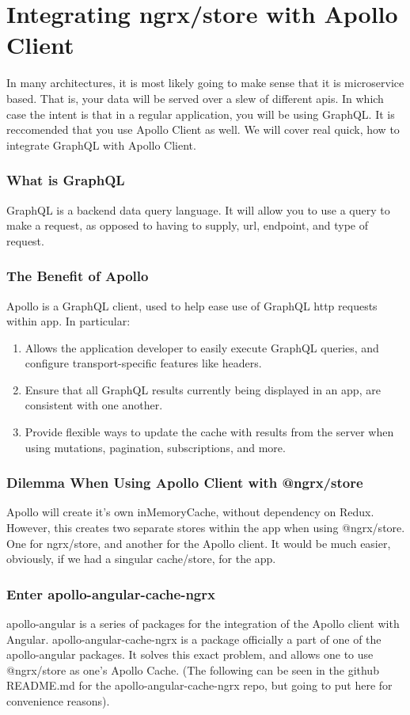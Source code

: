 \section{ Integrating ngrx/store with Apollo Client }
In many architectures, it is most likely going to make sense that it is
microservice based. That is, your data will be served over a slew of different
apis. In which case the intent is that in a regular application, you will be
using GraphQL. It is reccomended that you use Apollo Client as well. We will
cover real quick, how to integrate GraphQL with Apollo Client.

\subsubsection{ What is GraphQL }
GraphQL is a backend data query language. It will allow you to use a query to
make a request, as opposed to having to supply, url, endpoint, and type of
request.

\subsubsection{ The Benefit of Apollo }
Apollo is a GraphQL client, used to help ease use of GraphQL http requests
within app. In particular:
\begin{enumerate}
  \item Allows the application developer to easily execute GraphQL queries, and
  configure transport-specific features like headers.
  \item Ensure that all GraphQL results currently being displayed in an app, are
   consistent with one another.
  \item Provide flexible ways to update the cache with results from the server
  when using mutations, pagination, subscriptions, and more.
\end{enumerate}

\subsubsection{ Dilemma When Using Apollo Client with @ngrx/store }
Apollo will create it’s own inMemoryCache, without dependency on Redux. However,
this creates two separate stores within the app when using @ngrx/store.
One for ngrx/store, and another for the Apollo client. It would be much easier,
obviously, if we had a singular cache/store, for the app.

\subsubsection{ Enter apollo-angular-cache-ngrx }
apollo-angular is a series of packages for the integration of the Apollo client
with Angular. apollo-angular-cache-ngrx is a package officially a part of one of
the apollo-angular packages. It solves this exact problem, and allows one to use
@ngrx/store as one’s Apollo Cache. (The following can be seen in the github
README.md for the apollo-angular-cache-ngrx repo, but going to put here for
convenience reasons).

